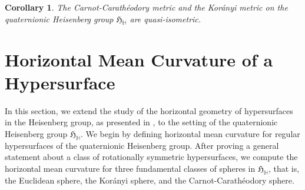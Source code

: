\documentclass [12pt,a4paper]{amsart}
\newcommand{\mH}{\mathbb{H}}
\newcommand{\frakH}{\mathfrak{H}}
\theoremstyle{plain}
\newtheorem{cor}[thm]{Corollary}
\theoremstyle{definition}
\numberwithin{equation}{section}
\begin{document}
\begin{cor}
The Carnot-Carathéodory metric and the Kor\'{a}nyi metric on the quaternionic Heisenberg group $\frakH_\mH$ are quasi-isometric.
\end{cor}


\section{Horizontal Mean Curvature of a Hypersurface}\label{sec:hyp}
In this section, we extend the study of the horizontal geometry of hypersurfaces in the Heisenberg group, as presented in \cite{CDPT}, to the setting of the quaternionic Heisenberg group $\frakH_\mH$.
We begin by defining horizontal mean curvature for regular hypersurfaces of the quaternionic Heisenberg group. After proving a general statement about a class of rotationally symmetric hypersurfaces, we compute the horizontal mean curvature for three fundamental classes of spheres in $\frakH_\mH$, that is, the Euclidean sphere,  the Kor\'anyi sphere, and  the Carnot-Carathéodory sphere.
\end{document}
